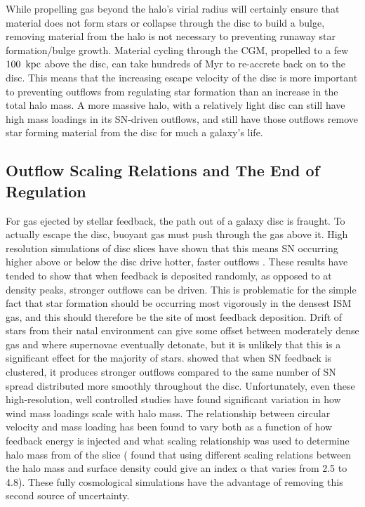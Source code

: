While propelling
gas beyond the halo's virial radius will certainly ensure that material does not
form stars or collapse through the disc to build a bulge, removing material from
the halo is not necessary to preventing runaway star formation/bulge growth.
Material cycling through the CGM, propelled to a few $100\;\>{\rm kpc}$ above the disc,
can take hundreds of Myr to re-accrete back on to the disc.  This means that the
increasing escape velocity of the disc is more important to preventing outflows
from regulating star formation than an increase in the total halo mass.  A more
massive halo, with a relatively light disc can still have high mass loadings in
its SN-driven outflows, and still have those outflows remove star forming
material from the disc for much a galaxy's life.

\subsection{Outflow Scaling Relations and The End of Regulation}
For gas ejected by stellar feedback, the path out of a galaxy disc is fraught.
To actually escape the disc, buoyant gas must push through the gas above it.
High resolution simulations of disc slices have shown that this means SN
occurring higher above or below the disc drive hotter, faster outflows
\citep{vonGlasow2013,Sarkar2015}.  These results have tended to show that when
feedback is deposited randomly, as opposed to at density peaks, stronger
outflows can be driven.  This is problematic for the simple fact that star
formation should be occurring most vigorously in the densest ISM gas, and this
should therefore be the site of most feedback deposition.  Drift of stars from
their natal environment can give some offset between moderately dense gas and where 
supernovae eventually detonate, but it is unlikely that this is a significant effect
for the majority of stars.  \citet{Governato2010,vonGlasow2013,Christensen2016}
showed that when SN feedback is clustered, it produces stronger outflows
compared to the same number of SN spread distributed more smoothly throughout
the disc.  Unfortunately, even these high-resolution, well controlled studies
have found significant variation in how wind mass loadings scale with halo mass.
The relationship between circular velocity and mass loading has been found to
vary both as a function of how feedback energy is injected \citep{vonGlasow2013}
and what scaling relationship was used to determine halo mass from of the slice
(\citet{Creasey2013} found that using different scaling relations between the
halo mass and surface density could give an index $\alpha$ that varies from 2.5
to 4.8).  These fully cosmological simulations have the advantage of removing
this second source of uncertainty.

